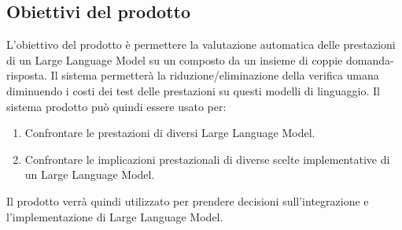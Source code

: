 \subsection{Obiettivi del prodotto}
L'obiettivo del prodotto è permettere la valutazione automatica delle prestazioni di un Large Language Model su un  composto da un insieme di coppie domanda-risposta.
Il sistema permetterà la riduzione/eliminazione della verifica umana diminuendo i costi dei test delle prestazioni su questi modelli di linguaggio.
Il sistema prodotto può quindi essere usato per:
\begin{enumerate}
    \item Confrontare le prestazioni di diversi Large Language Model.
    \item Confrontare le implicazioni prestazionali di diverse scelte implementative di un Large Language Model.
\end{enumerate} 
Il prodotto verrà quindi utilizzato per prendere decisioni sull'integrazione e l'implementazione di Large Language Model.